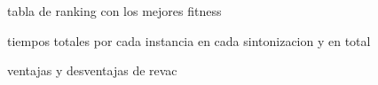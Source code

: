 %


tabla de ranking con los mejores fitness


tiempos totales por cada instancia en cada sintonizacion y en total


ventajas y desventajas de revac




